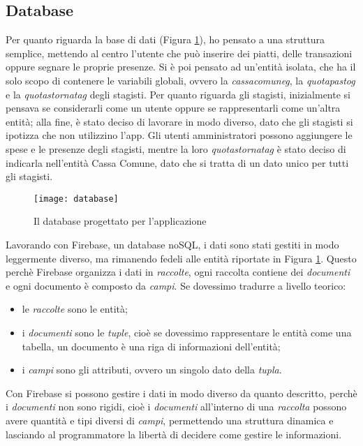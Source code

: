\subsection{Database}
Per quanto riguarda la base di dati (Figura \ref{fig:database}), ho pensato a una struttura semplice, mettendo al centro l'utente che può inserire dei piatti, delle transazioni oppure segnare le proprie presenze.\newline
Si è poi pensato ad un'entità isolata, che ha il solo scopo di contenere le variabili globali, ovvero la \emph{\gls{cassacomuneg}}, la \emph{\gls{quotapastog}} e la \emph{\gls{quotastornatag}} degli stagisti.\newline
Per quanto riguarda gli stagisti, inizialmente si pensava se considerarli come un utente oppure se rappresentarli come un'altra entità; alla fine, è stato deciso di lavorare in modo diverso, dato che gli stagisti si ipotizza che non utilizzino l'app.\newline
Gli utenti amministratori possono aggiungere le spese e le presenze degli stagisti, mentre la loro \emph{\gls{quotastornatag}} è stato deciso di indicarla nell'entità Cassa Comune, dato che si tratta di un dato unico per tutti gli stagisti.\newline
\begin{figure}[!h] 
    \centering 
    \texttt{[image: database]} 
    \caption{Il database progettato per l'applicazione}
    \label{fig:database}
\end{figure}
\newline
Lavorando con Firebase, un database noSQL, i dati sono stati gestiti in modo leggermente diverso, ma rimanendo fedeli alle entità riportate in Figura \ref{fig:database}.\newline
Questo perchè Firebase organizza i dati in \emph{raccolte}, ogni raccolta contiene dei \emph{documenti} e ogni documento è composto da \emph{campi}.\newline
Se dovessimo tradurre a livello teorico:
\begin{itemize}
    \item le \emph{raccolte} sono le entità;
    \item i \emph{documenti} sono le \emph{tuple}, cioè se dovessimo rappresentare le entità come una tabella, un documento è una riga di informazioni dell'entità;
    \item i \emph{campi} sono gli attributi, ovvero un singolo dato della \emph{tupla}.
\end{itemize}
Con Firebase si possono gestire i dati in modo diverso da quanto descritto, perchè i \emph{documenti} non sono rigidi, cioè i \emph{documenti} all'interno di una \emph{raccolta} possono avere quantità e tipi diversi di \emph{campi}, permettendo una struttura dinamica e lasciando al programmatore la libertà di decidere come gestire le informazioni.\newline
